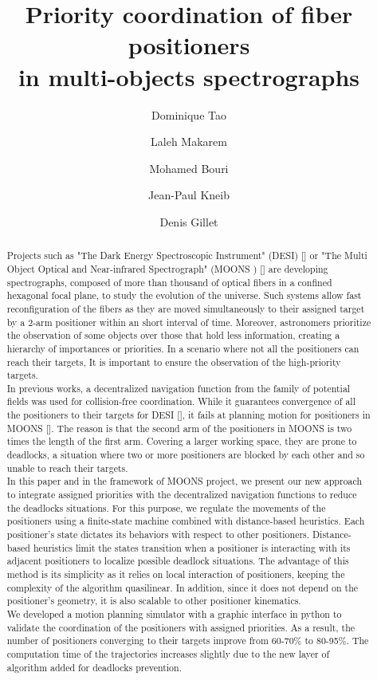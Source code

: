 \documentclass[]{spie}  %
\title{Priority coordination of fiber positioners\\
	in multi-objects spectrographs }
\author[a]{Dominique Tao}
\author[b]{Laleh Makarem}
\author[c]{Mohamed Bouri}
\author[d]{Jean-Paul Kneib}
\author[e]{Denis Gillet}
\affil[a,b,e]{REACT, Ecole Polytechnique Federale de Lausanne (EPFL), Switzerland}
\affil[c]{LSRO, Ecole Polytechnique Federale de Lausanne (EPFL), Switzerland}
\affil[d]{LASTRO, Ecole Polytechnique Federale de Lausanne (EPFL), Switzerland}
\begin{document}
 
	\maketitle
	
	\begin{abstract}
		Projects such as "The Dark Energy Spectroscopic Instrument" (DESI)  [] or "The Multi Object Optical and Near-infrared Spectrograph" (MOONS ) [] are developing spectrographs, composed of more than thousand of optical fibers in a confined hexagonal focal plane, to study the evolution of the universe. Such systems allow fast reconfiguration of the fibers as they are moved simultaneously to their assigned target by a 2-arm positioner within an short interval of time. Moreover, astronomers prioritize the observation of some objects over those that hold less information, creating a hierarchy of importances or priorities. In a scenario where not all the positioners can reach their targets, It is important to ensure the observation of the high-priority targets. \\
		In previous works, a decentralized navigation function from the family of potential fields was used for collision-free coordination. While it guarantees convergence of all the positioners to their targets for DESI [], it fails at planning motion for positioners in MOONS []. The reason is that the second arm of the positioners in MOONS is two times the length of the first arm. Covering a larger working space, they are prone to deadlocks, a situation where two or more positioners are blocked by each other and so unable to reach their targets.\\
		In this paper and in the framework of MOONS project, we present our new approach to integrate assigned priorities with the decentralized navigation functions to reduce the deadlocks situations. For this purpose, we regulate the movements of the positioners using a finite-state machine combined with distance-based heuristics. Each positioner's state dictates its behaviors with respect to other positioners. Distance-based heuristics limit the states transition when a positioner is interacting with its adjacent positioners to localize possible deadlock situations. The advantage of this method is its simplicity as it relies on local interaction of positioners, keeping the complexity of the algorithm quasilinear. In addition, since it does not depend on the positioner's geometry, it is also scalable to other positioner kinematics. \\
		We developed a motion planning simulator with a graphic interface in python to validate the coordination of the positioners with assigned priorities.  As a result, the number of positioners converging to their targets improve from 60-70\% to 80-95\%. The computation time of the trajectories increases slightly due to the new layer of algorithm added for deadlocks prevention.
	\end{abstract}
	
\end{document}
